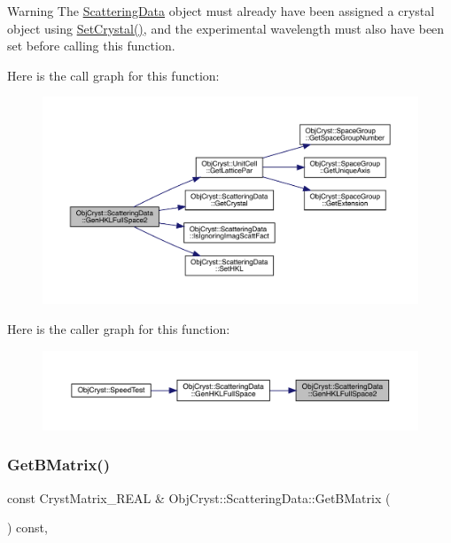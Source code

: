 \begin{DoxyWarning}{Warning}
The \mbox{\hyperlink{class_obj_cryst_1_1_scattering_data}{Scattering\+Data}} object must already have been assigned a crystal object using \mbox{\hyperlink{class_obj_cryst_1_1_scattering_data_a590a553dbea1970266a864256ebf94f3}{Set\+Crystal()}}, and the experimental wavelength must also have been set before calling this function. 
\end{DoxyWarning}
Here is the call graph for this function\+:
\nopagebreak
\begin{figure}[H]
\begin{center}
\leavevmode
\includegraphics[width=350pt]{class_obj_cryst_1_1_scattering_data_a63f682dfda2e03f2ab00826c5e116033_cgraph}
\end{center}
\end{figure}
Here is the caller graph for this function\+:
\nopagebreak
\begin{figure}[H]
\begin{center}
\leavevmode
\includegraphics[width=350pt]{class_obj_cryst_1_1_scattering_data_a63f682dfda2e03f2ab00826c5e116033_icgraph}
\end{center}
\end{figure}
\mbox{\label{class_obj_cryst_1_1_scattering_data_abd28bb9c58ba25cc61cb138cab3df5de}} 
\subsubsection{\texorpdfstring{GetBMatrix()}{GetBMatrix()}}
{\footnotesize\ttfamily const Cryst\+Matrix\+\_\+\+R\+E\+AL \& Obj\+Cryst\+::\+Scattering\+Data\+::\+Get\+B\+Matrix (\begin{DoxyParamCaption}{ }\end{DoxyParamCaption}) const\hspace{0.3cm}{\ttfamily [protected]}, {\ttfamily [virtual]}}

